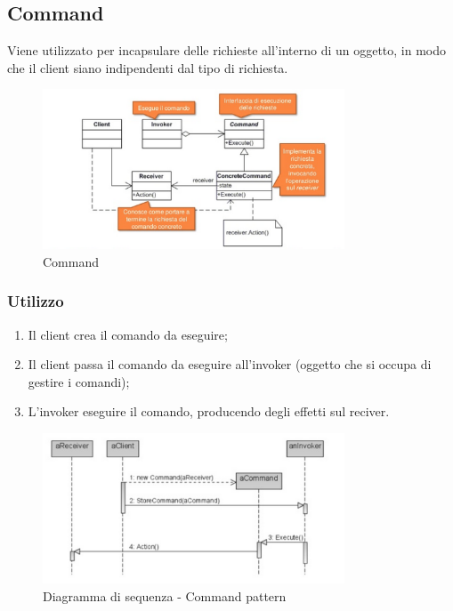 \subsection{Command}
Viene utilizzato per incapsulare delle richieste all'interno di un oggetto, in modo che il client siano indipendenti dal tipo di richiesta.

\begin{figure}[ht]
    \centering
    \includegraphics[width=0.8\textwidth]{immagini/command.png}
    \caption{Command}
\end{figure}
\FloatBarrier

\subsubsection{Utilizzo}
\begin{enumerate}
\item Il client crea il comando da eseguire;
\item Il client passa il comando da eseguire all'invoker (oggetto che si occupa di gestire i comandi);
\item L'invoker eseguire il comando, producendo degli effetti sul reciver.
\end{enumerate}
\begin{figure}[ht]
    \centering
    \includegraphics[width=0.8\textwidth]{immagini/commandSequence.png}
    \caption{Diagramma di sequenza - Command pattern}
\end{figure}
\FloatBarrier


